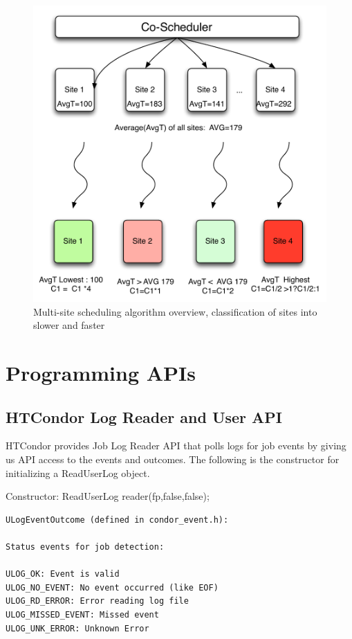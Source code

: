 \documentclass[ms,electronic,double]{nuthesis}
\begin{document}
\begin{figure}[htbp!]
\begin{center}
\includegraphics[scale=0.75]{images/multipleSites}
\caption{Multi-site scheduling algorithm overview, classification of sites into slower and faster}
\label{fig:multiSite1}
\end{center}
\end{figure}
\FloatBarrier

\section{Programming APIs}
\subsection{HTCondor Log Reader and User API}

HTCondor provides Job Log Reader API \cite{manual56} that polls logs for job events by giving us 
API access to the events and outcomes. The following is the constructor for 
initializing a ReadUserLog object.

Constructor:
ReadUserLog reader(fp,false,false);
\begin{verbatim}
ULogEventOutcome (defined in condor_event.h):

Status events for job detection:

ULOG_OK: Event is valid
ULOG_NO_EVENT: No event occurred (like EOF)
ULOG_RD_ERROR: Error reading log file
ULOG_MISSED_EVENT: Missed event
ULOG_UNK_ERROR: Unknown Error
\end{verbatim}
\end{document}
